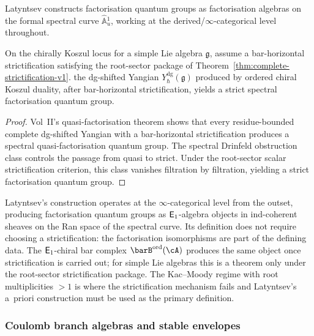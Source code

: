 Latyntsev constructs factorisation quantum groups as factorisation
algebras on the formal spectral curve $\widehat{\mathbb{A}}{}^1_u$,
working at the derived/$\infty$-categorical level throughout.

\begin{theorem}
\label{thm:factorisation-identification}
On the chirally Koszul locus for a simple Lie algebra $\mathfrak{g}$,
assume a bar-horizontal strictification satisfying the root-sector
package of Theorem~\textup{\ref{thm:complete-strictification-v1}}.
the dg-shifted Yangian $Y^{\mathrm{dg}}_\hbar(\mathfrak{g})$ produced
by ordered chiral Koszul duality, after bar-horizontal strictification,
yields a strict spectral factorisation quantum group.
\end{theorem}

\begin{proof}
Vol~II's quasi-factorisation theorem shows that every
residue-bounded complete dg-shifted Yangian with a
bar-horizontal strictification produces a spectral quasi-factorisation
quantum group. The spectral Drinfeld obstruction class controls the
passage from quasi to strict. Under the root-sector scalar
strictification criterion, this class vanishes filtration by
filtration, yielding a strict
factorisation quantum group.
\end{proof}

\begin{remark}
Latyntsev's construction operates at the $\infty$-categorical level from the
outset, producing factorisation quantum groups as $\mathsf{E}_1$-algebra objects in
ind-coherent sheaves on the Ran space of the spectral curve. Its
definition does not require choosing a strictification: the
factorisation isomorphisms are part of the defining data. The
$\mathsf{E}_1$-chiral bar complex $\barB^{\mathrm{ord}}(\cA)$ produces the
same object once strictification is carried out; for simple Lie
algebras this is a theorem only under the root-sector strictification
package. The
Kac--Moody regime with root multiplicities $>1$ is where the
strictification mechanism fails and Latyntsev's a~priori construction
must be used as the primary definition.
\end{remark}

\subsubsection*{Coulomb branch algebras and stable envelopes}

